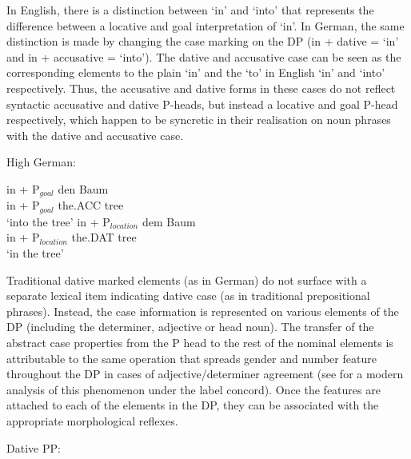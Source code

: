 In English, there is a distinction between `in' and `into' that represents the difference between a locative and goal interpretation of `in'. In German, the same distinction is made by changing the case marking on the DP (in + dative = `in' and in + accusative = `into'). The dative and accusative case can be seen as the corresponding elements to the plain `in' and the `to' in English `in' and `into' respectively. Thus, the accusative and dative forms in these cases do not reflect syntactic accusative and dative P-heads, but instead a locative and goal P-head respectively, which happen to be syncretic in their realisation on noun phrases with the dative and accusative case.

\begin{exe}
	\ex High German:\label{ex:hg-Pcomp}
	\begin{xlist}
		\ex \gll in + P$_{goal}$ den Baum\\
			 in + P$_{goal}$ the.ACC tree\\
			 \trans `into the tree'
		\ex \gll in + P$_{location}$ dem Baum\\
			 in + P$_{location}$ the.DAT tree\\
			 \trans `in the tree'
	\end{xlist}

\end{exe}

Traditional dative marked elements (as in German) do not surface with a separate lexical item indicating dative case (as in traditional prepositional phrases). Instead, the case information is represented on various elements of the DP (including the determiner, adjective or head noun). The transfer of the abstract case properties from the P head to the rest of the nominal elements is attributable to the same operation that spreads gender and number feature throughout the DP in cases of adjective/determiner agreement (see \citealt{Norris.2012} for a modern analysis of this phenomenon under the label concord). Once the features are attached to each of the elements in the DP, they can be associated with the appropriate morphological reflexes.

\begin{exe}
\ex Dative PP: \\
\end{exe}


